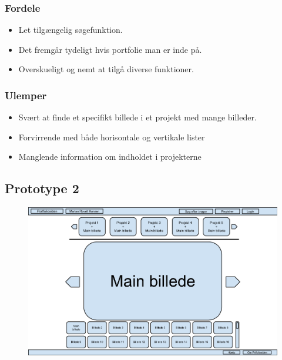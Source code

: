 \documentclass[a4paper,titlepage,fleqn,12pt]{article}
\begin{document}
\subsubsection{Fordele}

\begin{itemize}
	\item Let tilgængelig søgefunktion.
	\item Det fremgår tydeligt hvis portfolie man er inde på.
	\item Overskueligt og nemt at tilgå diverse funktioner.
\end{itemize}

\subsubsection{Ulemper}
\begin{itemize}
	\item Svært at finde et specifikt billede i et projekt med mange billeder. 
	\item Forvirrende med både horisontale og vertikale lister
	\item Manglende information om indholdet i projekterne
\end{itemize}

\subsection{Prototype 2}

\begin{figure}[H]
	\includegraphics[width=\textwidth]{Prototype_1_not_logged_in.png}
\end{figure}
\end{document}
